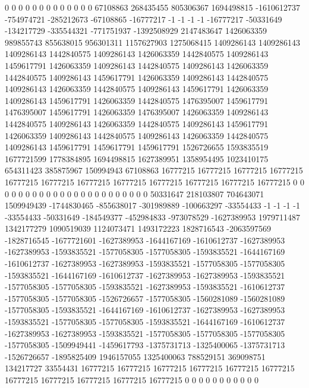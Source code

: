 0 0 0 0 0 0 0 0 0 0 0 0 0 67108863 268435455 805306367 1694498815 -1610612737 -754974721 -285212673 -67108865 -16777217 -1 -1 -1 -1 -16777217 -50331649 -134217729 -335544321 -771751937 -1392508929 2147483647 1426063359 989855743 855638015 956301311 1157627903 1275068415 1409286143 1409286143 1409286143 1442840575 1409286143 1426063359 1442840575 1409286143 1459617791 1426063359 1409286143 1442840575 1409286143 1426063359 1442840575 1409286143 1459617791 1426063359 1409286143 1442840575 1409286143 1426063359 1442840575 1409286143 1459617791 1426063359 1409286143 1459617791 1426063359 1442840575 1476395007 1459617791 1476395007 1459617791 1426063359 1476395007 1426063359 1409286143 1442840575 1409286143 1426063359 1442840575 1409286143 1459617791 1426063359 1409286143 1442840575 1409286143 1426063359 1442840575 1409286143 1459617791 1459617791 1459617791 1526726655 1593835519 1677721599 1778384895 1694498815 1627389951 1358954495 1023410175 654311423 385875967 150994943 67108863 16777215 16777215 16777215 16777215 16777215 16777215 16777215 16777215 16777215 16777215 16777215 16777215 0 0 0 0 0 0 0 0 0 0 0
0 0 0 0 0 0 0 0 0 0 0 0 50331647 218103807 704643071 1509949439 -1744830465 -855638017 -301989889 -100663297 -33554433 -1 -1 -1 -1 -33554433 -50331649 -184549377 -452984833 -973078529 -1627389953 1979711487 1342177279 1090519039 1124073471 1493172223 1828716543 -2063597569 -1828716545 -1677721601 -1627389953 -1644167169 -1610612737 -1627389953 -1627389953 -1593835521 -1577058305 -1577058305 -1593835521 -1644167169 -1610612737 -1627389953 -1627389953 -1593835521 -1577058305 -1577058305 -1593835521 -1644167169 -1610612737 -1627389953 -1627389953 -1593835521 -1577058305 -1577058305 -1593835521 -1627389953 -1593835521 -1610612737 -1577058305 -1577058305 -1526726657 -1577058305 -1560281089 -1560281089 -1577058305 -1593835521 -1644167169 -1610612737 -1627389953 -1627389953 -1593835521 -1577058305 -1577058305 -1593835521 -1644167169 -1610612737 -1627389953 -1627389953 -1593835521 -1577058305 -1577058305 -1577058305 -1577058305 -1509949441 -1459617793 -1375731713 -1325400065 -1375731713 -1526726657 -1895825409 1946157055 1325400063 788529151 369098751 134217727 33554431 16777215 16777215 16777215 16777215 16777215 16777215 16777215 16777215 16777215 16777215 16777215 0 0 0 0 0 0 0 0 0 0 0
